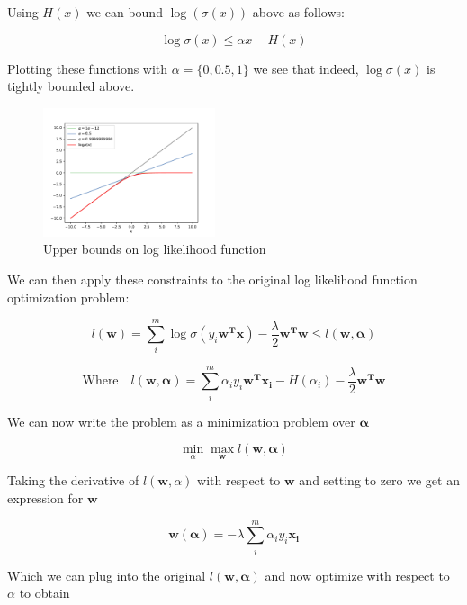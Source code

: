 \documentclass[11pt]{amsart}
\newcommand{\vek}[1]{\mathbf{#1}}
\begin{document}
Using $H(x)$ we can bound $\log(\sigma(x))$ above as follows:

\begin{equation}
\log\sigma(x) \leq \alpha x - H(x)
\end{equation} 

Plotting these functions with $\alpha = \{0, 0.5, 1\}$ we see that indeed, $\log\sigma(x)$ is tightly bounded above.

\begin{figure}
\includegraphics[width=0.45\textwidth]{bounds.pdf}
\caption{Upper bounds on log likelihood function}
\end{figure}

We can then apply these constraints to the original log likelihood function optimization problem:

\begin{equation}
l(\vek{w}) = \sum_{i}^{m} \log \sigma(y_i\vek{w^T}\vek{x}) - \frac{\lambda}{2}\vek{w^T}\vek{w} \leq l(\vek{w}, \vek{\alpha})
\end{equation}

\begin{equation}
\text{Where}\quad l(\vek{w}, \vek{\alpha}) = \sum_{i}^{m} \alpha_{i}y_{i}\vek{w^Tx_i} - H(\alpha_i) - \frac{\lambda}{2}\vek{w^Tw}
\end{equation}

We can now write the problem as a minimization problem over $\vek{\alpha}$

\begin{equation}
\min_{\alpha}\max_{\vek{w}} l(\vek{w}, \vek{\alpha})
\end{equation}

Taking the derivative of $l(\vek{w}, \alpha)$ with respect to $\vek{w}$ and setting to zero we get an expression for $\vek{w}$

\begin{equation}
\vek{w(\alpha)} = -\lambda\sum_{i}^{m}\alpha_{i}y_{i}\vek{x_i}
\end{equation}

Which we can plug into the original $l(\vek{w}, \vek{\alpha})$ and now optimize with respect to $\alpha$ to obtain
\end{document}
